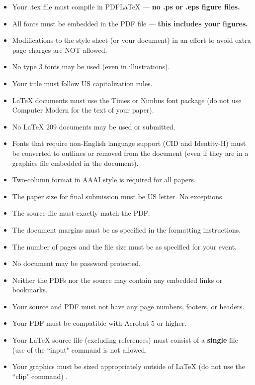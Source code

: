 \documentclass[letterpaper]{article}
\begin{document}
\begin{itemize}
  \item Your .tex file must compile in PDF\LaTeX{} --- \textbf{ no .ps or .eps figure files.}
  \item All fonts must be embedded in the PDF file --- \textbf{ this includes your figures.}
  \item Modifications to the style sheet (or your document) in an effort to avoid extra page charges are NOT allowed.
  \item No type 3 fonts may be used (even in illustrations).
  \item Your title must follow US capitalization rules.
  \item \LaTeX{} documents must use the Times or Nimbus font package (do not use Computer Modern for the text of your paper).
  \item No \LaTeX{} 209 documents may be used or submitted.
  \item Fonts that require non-English language support (CID and Identity-H) must be converted to outlines or removed from the document (even if they are in a graphics file embedded in the document).
  \item Two-column format in AAAI style is required for all papers.
  \item The paper size for final submission must be US letter. No exceptions.
  \item The source file must exactly match the PDF.
  \item The document margins must be as specified in the formatting instructions.
  \item The number of pages and the file size must be as specified for your event.
  \item No document may be password protected.
  \item Neither the PDFs nor the source may contain any embedded links or bookmarks.
  \item Your source and PDF must not have any page numbers, footers, or headers.
  \item Your PDF must be compatible with Acrobat 5 or higher.
  \item Your \LaTeX{} source file (excluding references) must consist of a \textbf{single} file (use of the ``input" command is not allowed.
  \item Your graphics must be sized appropriately outside of \LaTeX{} (do not use the ``clip" command) .
\end{itemize}
\end{document}
